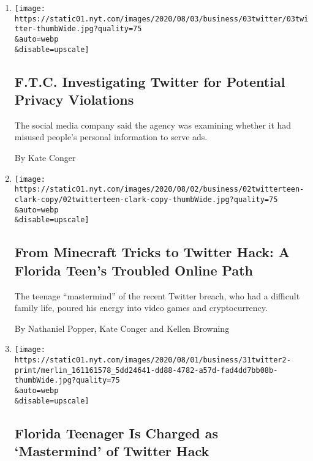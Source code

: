 \begin{enumerate}
\def\labelenumi{\arabic{enumi}.}
\item
  \href{/2020/08/03/technology/ftc-twitter-privacy-violations.html}{}

  \texttt{[image: https://static01.nyt.com/images/2020/08/03/business/03twitter/03twitter-thumbWide.jpg?quality=75\\\&auto=webp\\\&disable=upscale]}

  \hypertarget{ftc-investigating-twitter-for-potential-privacy-violations}{%
  \subsection{F.T.C. Investigating Twitter for Potential Privacy
  Violations}\label{ftc-investigating-twitter-for-potential-privacy-violations}}

  The social media company said the agency was examining whether it had
  misused people's personal information to serve ads.

  By Kate Conger
\item
  \href{/2020/08/02/technology/florida-teenager-twitter-hack.html}{}

  \texttt{[image: https://static01.nyt.com/images/2020/08/02/business/02twitterteen-clark-copy/02twitterteen-clark-copy-thumbWide.jpg?quality=75\\\&auto=webp\\\&disable=upscale]}

  \hypertarget{from-minecraft-tricks-to-twitter-hack-a-florida-teens-troubled-online-path}{%
  \subsection{From Minecraft Tricks to Twitter Hack: A Florida Teen's
  Troubled Online
  Path}\label{from-minecraft-tricks-to-twitter-hack-a-florida-teens-troubled-online-path}}

  The teenage ``mastermind'' of the recent Twitter breach, who had a
  difficult family life, poured his energy into video games and
  cryptocurrency.

  By Nathaniel Popper, Kate Conger and Kellen Browning
\item
  \href{/2020/07/31/technology/twitter-hack-arrest.html}{}

  \texttt{[image: https://static01.nyt.com/images/2020/08/01/business/31twitter2-print/merlin\_161161578\_5dd24641-dd88-4782-a57d-fad4dd7bb08b-thumbWide.jpg?quality=75\\\&auto=webp\\\&disable=upscale]}

  \hypertarget{florida-teenager-is-charged-as-mastermind-of-twitter-hack}{%
  \subsection{Florida Teenager Is Charged as `Mastermind' of Twitter
  Hack}\label{florida-teenager-is-charged-as-mastermind-of-twitter-hack}}


\end{enumerate}
